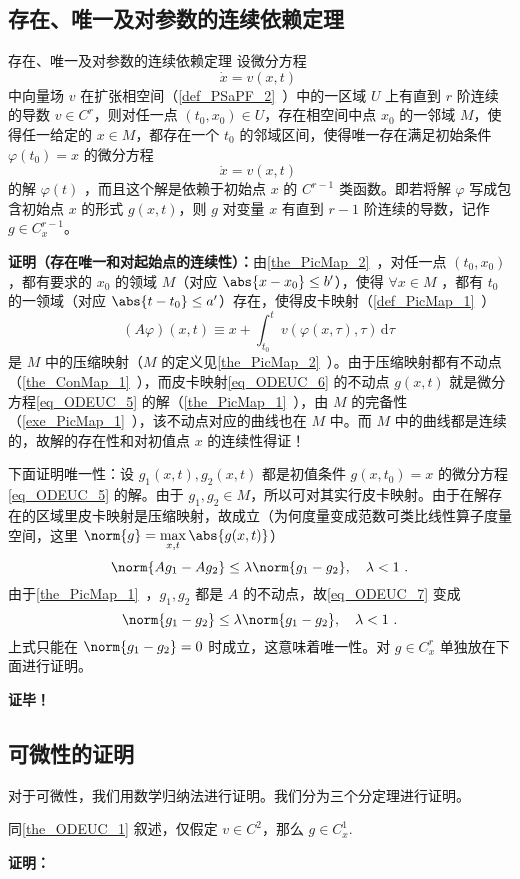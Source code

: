 \subsection{存在、唯一及对参数的连续依赖定理}
\begin{theorem}{存在、唯一及对参数的连续依赖定理}\label{the_ODEUC_1}
设微分方程
\begin{equation}
\dot x=v(x,t)~
\end{equation}
中向量场 $v$ 在扩张相空间（\autoref{def_PSaPF_2}~）中的一区域 $U$ 上有直到 $r$ 阶连续的导数 $v\in C^r$，则对任一点 $(t_0,x_0)\in U$，存在相空间中点 $x_0$ 的一邻域 $M$，使得任一给定的 $x\in M$，都存在一个 $t_0$ 的邻域区间，使得唯一存在满足初始条件 $\varphi(t_0)=x$ 的微分方程
\begin{equation}\label{eq_ODEUC_5}
\dot x=v(x,t)~
\end{equation}
的解 $\varphi(t)$ ，而且这个解是依赖于初始点 $x$ 的 $C^{r-1}$ 类函数。即若将解 $\varphi$ 写成包含初始点 $x$ 的形式 $g(x,t)$，则 $g$ 对变量 $x$ 有直到 $r-1$ 阶连续的导数，记作  $g\in C_x^{r-1}$。
\end{theorem}
\textbf{证明（存在唯一和对起始点的连续性）：}由\autoref{the_PicMap_2}~，对任一点 $(t_0,x_0)$，都有要求的 $x_0$ 的领域 $M$（对应 $\abs{x-x_0}\leq b'$），使得 $\forall x\in M$ ，都有  $t_0$ 的一领域（对应 $\abs{t-t_0}\leq a'$）存在，使得皮卡映射（\autoref{def_PicMap_1}~）
\begin{equation}\label{eq_ODEUC_6}
(A\varphi)(x,t)\equiv x+\int_{t_0}^{t}v(\varphi(x,\tau),\tau) \,\mathrm{d}{\tau} ~
\end{equation}
是 $M$ 中的压缩映射（$M$ 的定义见\autoref{the_PicMap_2}~）。由于压缩映射都有不动点（\autoref{the_ConMap_1}~），而皮卡映射\autoref{eq_ODEUC_6} 的不动点 $g(x,t)$ 就是微分方程\autoref{eq_ODEUC_5} 的解（\autoref{the_PicMap_1}~），由 $M$ 的完备性（\autoref{exe_PicMap_1}~），该不动点对应的曲线也在 $M$ 中。而 $M$ 中的曲线都是连续的，故解的存在性和对初值点 $x$ 的连续性得证！

下面证明唯一性：设 $g_1(x,t),g_2(x,t)$ 都是初值条件 $g(x,t_0)=x$ 的微分方程\autoref{eq_ODEUC_5} 的解。由于 $g_1,g_2\in M$，所以可对其实行皮卡映射。由于在解存在的区域里皮卡映射是压缩映射，故成立（为何度量变成范数可类比线性算子度量空间，这里 $\norm{g}=\max\limits_{x,t}\abs{g(x,t)}$）
\begin{equation}\label{eq_ODEUC_7}
\norm{A g_1-A g_2}\leq\lambda\norm{g_1-g_2},\quad\lambda<1~.
\end{equation}
由于\autoref{the_PicMap_1}~，$g_1,g_2$ 都是 $A$ 的不动点，故\autoref{eq_ODEUC_7} 变成
\begin{equation}
\norm{g_1-g_2}\leq\lambda\norm{g_1-g_2},\quad\lambda<1~.
\end{equation}
上式只能在 $\norm{g_1-g_2}=0$ 时成立，这意味着唯一性。对 $g\in C_x^r$ 单独放在下面进行证明。

\textbf{证毕！}

\subsection{可微性的证明}
对于可微性，我们用数学归纳法进行证明。我们分为三个分定理进行证明。
\begin{theorem}{}
同\autoref{the_ODEUC_1} 叙述，仅假定 $v\in C^2$，那么 $g\in C_x^1$.
\end{theorem}
\textbf{证明：}